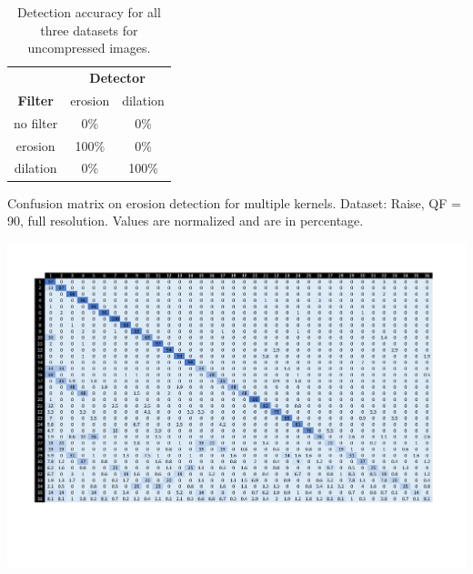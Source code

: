 \documentclass{ieeeaccess}
\begin{document}
\begin{table}[!ht]
	\centering
	\caption{Detection accuracy for all three datasets for uncompressed images.}
	\label{tab1:det_acc}
	\begin{tabular}{|l|l|l}
		\hline\hline%
		\multicolumn{1}{c|}{}		     & \multicolumn{2}{c}{\textbf{Detector}}	           				    \\ 
		\cline{2-3}
		\multicolumn{1}{c|}{\textbf{Filter}}    & \multicolumn{1}{c|}{erosion} & \multicolumn{1}{c}{dilation} \\ 
		\hline%
		\multicolumn{1}{c|}{no filter} & \multicolumn{1}{c|}{0\%} 	& \multicolumn{1}{c}{0\%}      \\ \hline
		\multicolumn{1}{c|}{erosion}   & \multicolumn{1}{c|}{100\%}   & \multicolumn{1}{c}{0\%}      \\ \hline
		\multicolumn{1}{c|}{dilation}  & \multicolumn{1}{c|}{0\%}     & \multicolumn{1}{c}{100\%}    \\ 
		\hline\hline
	\end{tabular}
\end{table}

\begin{table}
	\centering
	\caption{Confusion matrix on erosion detection for multiple kernels. Dataset: Raise, QF = 90, full resolution. Values are normalized and are in percentage.}
	\label{table:confusion}
	\includegraphics[width=\linewidth]{confusion}
\end{table}
\end{document}

